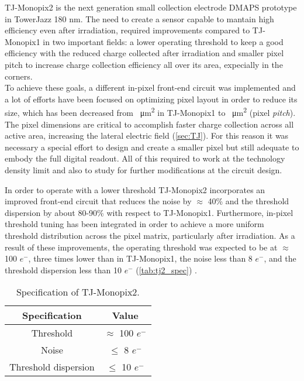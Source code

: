 TJ-Monopix2 is the next generation small collection electrode DMAPS prototype in TowerJazz 180 nm. The need to create a sensor capable to mantain high efficiency even after irradiation, required improvements compared to TJ-Monopix1 in two important fields: a lower operating threshold to keep a good efficiency with the reduced charge collected after irradiation and smaller pixel pitch to increase charge collection efficiency all over its area, expecially in the corners.\\

To achieve these goals, a different in-pixel front-end circuit was implemented and a lot of efforts have been focused on optimizing pixel layout in order to reduce its size, which has been decreased from ~\unit{\micro m^{2}} in TJ-Monopix1 to ~\unit{\micro m^{2}} (pixel \textit{pitch}). The pixel dimensions are critical to accomplish faster charge collection across all active area, increasing the lateral electric field (\autoref{sec:TJ}). For this reason it was necessary a special effort to design and create a smaller pixel but still adequate to embody the full digital readout. All of this required to work at the technology density limit and also to study for further modifications at the circuit design.

In order to operate with a lower threshold TJ-Monopix2 incorporates an improved front-end circuit that reduces the noise by $\approx$ 40\% and the threshold dispersion by about 80-90\% with respect to TJ-Monopix1. Furthermore, in-pixel threshold tuning has been integrated in order to achieve a more uniform threshold distribution across the pixel matrix, particularly after irradiation. As a result of these improvements, the operating threshold was expected to be at $\approx$ 100 $e^{-}$, three times lower than in TJ-Monopix1, the noise less than 8 $e^{-}$, and the threshold dispersion less than 10 $e^{-}$ (\autoref{tab:tj2_spec}) \cite{Moustakas:2021gjr}. 

\medskip

\begin{table}[h!]
\centering
\begin{tabular}{c|c}
Specification & Value \\
\hline
\hline
Threshold & $\approx$ 100 $e^{-}$\\
\hline
Noise & $\leq$ 8 $e^{-}$ \\ 
\hline
Threshold dispersion & $\leq$ 10 $e^{-}$\\
\hline
\hline
\end{tabular}
\caption{Specification of TJ-Monopix2.}
\label{tab:tj2_spec}
\end{table}


